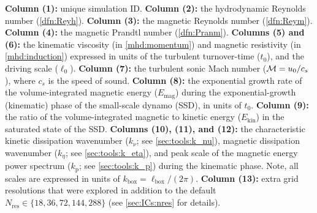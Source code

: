 \begin{table}
{{\begin{threeparttable}
\begin{tablenotes}
    \textbf{Column (1):} unique simulation ID. \textbf{Column (2):} the hydrodynamic Reynolds number (\autoref{dfn:Reyh}). \textbf{Column (3):} the magnetic Reynolds number (\autoref{dfn:Reym}). \textbf{Column (4):} the magnetic Prandtl number (\autoref{dfn:Pranm}). \textbf{Columns (5) and (6):} the kinematic viscosity (in \autoref{mhd:momentum}) and magnetic resistivity (in \autoref{mhd:induction}) expressed in units of the turbulent turnover-time ($t_0$), and the driving scale ($\ell_0$). \textbf{Column (7):} the turbulent sonic Mach number ($\mathcal{M} = u_0 / c_s$), where $c_s$ is the speed of sound. \textbf{Column (8):} the exponential growth rate of the volume-integrated magnetic energy ($E_{\mathrm{mag}}$) during the exponential-growth (kinematic) phase of the small-scale dynamo (SSD), in units of $t_0$. \textbf{Column (9):} the ratio of the volume-integrated magnetic to kinetic energy ($E_{\mathrm{kin}}$) in the saturated state of the SSD. \textbf{Columns (10), (11), and (12):} the characteristic kinetic dissipation wavenumber ($k_{\nu}$; see \autoref{sec:tools:k_nu}), magnetic dissipation wavenumber ($k_{\eta}$; see \autoref{sec:tools:k_eta}), and peak scale of the magnetic energy power spectrum ($k_{\mathrm{p}}$; see \autoref{sec:tools:k_p}) during the kinematic phase. Note, all scales are expressed in units of $k_{\mathrm{box}} = \ell_{\mathrm{box}}/(2\pi)$. \textbf{Column (13):} extra grid resolutions that were explored in addition to the default $N_\mathrm{res} \in \{18, 36, 72, 144, 288\}$ (see \autoref{sec:ICs:nres} for details).
\end{tablenotes}
\end{threeparttable}%
}%
}
\end{table}
